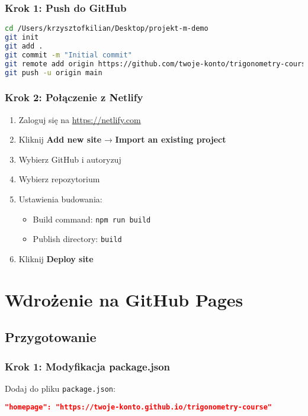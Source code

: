 \documentclass[12pt,a4paper]{article}
\begin{document}
\subsubsection{Krok 1: Push do GitHub}
\begin{lstlisting}[language=bash]
cd /Users/krzysztofkilian/Desktop/projekt-m-demo
git init
git add .
git commit -m "Initial commit"
git remote add origin https://github.com/twoje-konto/trigonometry-course.git
git push -u origin main
\end{lstlisting}

\subsubsection{Krok 2: Połączenie z Netlify}
\begin{enumerate}
    \item Zaloguj się na \url{https://netlify.com}
    \item Kliknij \textbf{Add new site} → \textbf{Import an existing project}
    \item Wybierz GitHub i autoryzuj
    \item Wybierz repozytorium
    \item Ustawienia budowania:
    \begin{itemize}
        \item Build command: \texttt{npm run build}
        \item Publish directory: \texttt{build}
    \end{itemize}
    \item Kliknij \textbf{Deploy site}
\end{enumerate}

\newpage
\section{Wdrożenie na GitHub Pages}

\subsection{Przygotowanie}

\subsubsection{Krok 1: Modyfikacja package.json}
Dodaj do pliku \texttt{package.json}:
\begin{lstlisting}[language=json]
"homepage": "https://twoje-konto.github.io/trigonometry-course"
\end{lstlisting}
\end{document}
